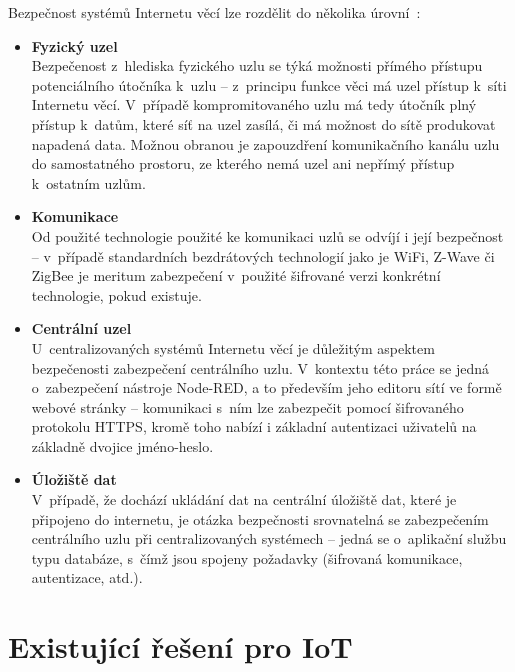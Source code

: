Bezpečnost systémů Internetu věcí lze rozdělit do několika úrovní~\cite{IoTSecurity}:
\begin{itemize}
    \item \textbf{Fyzický uzel} \\
    Bezpečenost z~hlediska fyzického uzlu se týká možnosti přímého přístupu potenciálního útočníka k~uzlu --
z~principu funkce věci má uzel přístup k~síti Internetu věcí.
    V~případě kompromitovaného uzlu má tedy útočník plný přístup k~datům, které síť na uzel zasílá, či má možnost do
    sítě produkovat napadená data.
    Možnou obranou je zapouzdření komunikačního kanálu uzlu do samostatného prostoru, ze kterého nemá uzel ani nepřímý
    přístup k~ostatním uzlům.

    \item \textbf{Komunikace} \\
    Od použité technologie použité ke komunikaci uzlů se odvíjí i její bezpečnost -- v~případě standardních
    bezdrátových technologií jako je WiFi, Z-Wave či ZigBee je meritum zabezpečení v~použité šifrované verzi
    konkrétní technologie, pokud existuje.

    \item \textbf{Centrální uzel} \\
    U~centralizovaných systémů Internetu věcí je důležitým aspektem bezpečenosti zabezpečení centrálního uzlu.
    V~kontextu této práce se jedná o~zabezpečení nástroje Node-RED, a to především jeho editoru
    sítí ve formě webové stránky -- komunikaci s~ním lze zabezpečit pomocí šifrovaného protokolu HTTPS, kromě toho
    nabízí i základní autentizaci uživatelů na základně dvojice jméno-heslo.

    \item \textbf{Úložiště dat} \\
    V~případě, že dochází ukládání dat na centrální úložiště dat, které je připojeno do internetu, je otázka
    bezpečnosti srovnatelná se zabezpečením centrálního uzlu při centralizovaných systémech -- jedná se o~aplikační
    službu typu databáze, s~čímž jsou spojeny požadavky (šifrovaná komunikace, autentizace, atd.).
\end{itemize}


\section{Existující řešení pro IoT}\label{sec:existujici-reseni}

